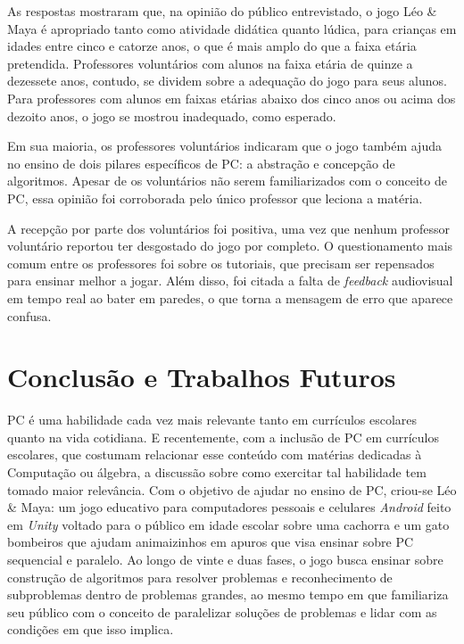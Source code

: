 \documentclass[conference]{IEEEtran}
\begin{document}
As respostas mostraram que, na opinião do público entrevistado, o jogo Léo \& Maya é apropriado tanto como atividade didática quanto lúdica, para crianças em idades entre cinco e catorze anos, o que é mais amplo do que a faixa etária pretendida. Professores voluntários com alunos na faixa etária de quinze a dezessete anos, contudo, se dividem sobre a adequação do jogo para seus alunos. Para professores com alunos em faixas etárias abaixo dos cinco anos ou acima dos dezoito anos, o jogo se mostrou inadequado, como esperado.

Em sua maioria, os professores voluntários indicaram que o jogo também ajuda no ensino de dois pilares específicos de PC: a abstração e concepção de algoritmos. Apesar de os voluntários não serem familiarizados com o conceito de PC, essa opinião foi corroborada pelo único professor que leciona a matéria.

A recepção por parte dos voluntários foi positiva, uma vez que nenhum professor voluntário reportou ter desgostado do jogo por completo. O questionamento mais comum entre os professores foi sobre os tutoriais, que precisam ser repensados para ensinar melhor a jogar. Além disso, foi citada a falta de \textit{feedback} audiovisual em tempo real ao bater em paredes, o que torna a mensagem de erro que aparece confusa.

\section{Conclusão e Trabalhos Futuros}

PC é uma habilidade cada vez mais relevante tanto em currículos escolares quanto na vida cotidiana. E recentemente, com a inclusão de PC em currículos escolares, que costumam relacionar esse conteúdo com matérias dedicadas à Computação ou álgebra, a discussão sobre como exercitar tal habilidade tem tomado maior relevância. Com o objetivo de ajudar no ensino de PC, criou-se Léo \& Maya: um jogo educativo para computadores pessoais e celulares \textit{Android} feito em \textit{Unity} voltado para o público em idade escolar sobre uma cachorra e um gato bombeiros que ajudam animaizinhos em apuros que visa ensinar sobre PC sequencial e paralelo. Ao longo de vinte e duas fases, o jogo busca ensinar sobre construção de algoritmos para resolver problemas e reconhecimento de subproblemas dentro de problemas grandes, ao mesmo tempo em que familiariza seu público com o conceito de paralelizar soluções de problemas e lidar com as condições em que isso implica. 
\end{document}
